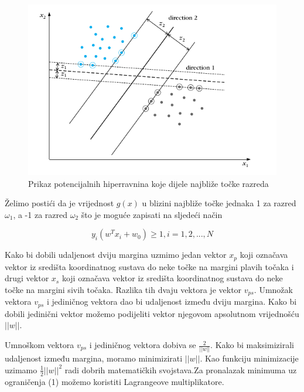 \documentclass[times, utf8, zavrsni]{fer}
\begin{document}
\begin{figure}[htbp]
\centering
\includegraphics[scale=0.5]{img/slika10.png}
\caption{Prikaz potencijalnih hiperravnina koje dijele najbliže točke razreda}
\end{figure}

Želimo postići da je vrijednost \(g(x)\) u blizini najbliže točke jednaka 1 za razred \(\omega_1\), a
-1 za razred \(\omega_2\) što je moguće zapisati na sljedeći način

\begin{equation}
y_i(w^Tx_i + w_0) \ge 1, i = 1,2,...,N
\end{equation}

Kako bi dobili udaljenost dviju margina uzmimo jedan vektor \(x_p\) koji označava 
vektor iz središta koordinatnog sustava do neke točke na margini plavih točaka i 
drugi vektor \(x_s\) koji označava vektor iz središta koordinatnog sustava do neke točke 
na margini sivih točaka. Razlika tih dvaju vektora je vektor \(v_{ps}\). Umnožak vektora 
\(v_{ps}\) i jediničnog vektora dao bi udaljenost između dviju margina. Kako bi dobili 
jedinični vektor možemo podijeliti vektor  njegovom apsolutnom vrijednošću \(\left| \left| w \right| \right|\). 

\bigbreak

Umnoškom vektora \(v_{ps}\) i jediničnog vektora dobiva se \(\frac{2}{\left| \left| w \right| \right|}\).
Kako bi maksimizirali udaljenost između margina, moramo minimizirati \(\left| \left| w \right| \right|\). 
Kao funkciju minimizacije uzimamo \(\frac{1}{2}\left| \left| w \right| \right|^2\) radi dobrih matematičkih
svojstava.Za pronalazak minimuma uz ograničenja (1) možemo koristiti Lagrangeove multiplikatore. 
\end{document}
